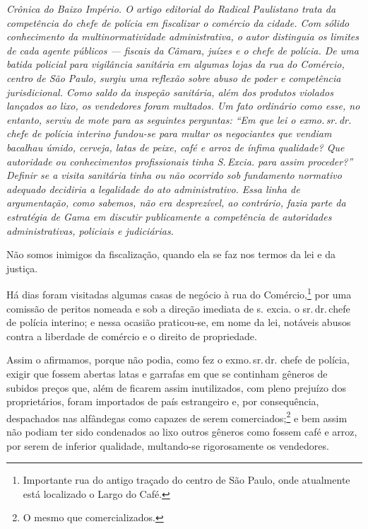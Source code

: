 \begin{didascalia}\itshape
Crônica do Baixo Império. O artigo editorial do \textnormal{Radical Paulistano}
trata da competência do chefe de polícia em fiscalizar o comércio
da cidade. Com sólido conhecimento da multinormatividade administrativa,
o autor distinguia os limites de cada agente públicos --- fiscais da
Câmara, juízes e o chefe de polícia. De uma batida policial para
vigilância sanitária em algumas lojas da rua do Comércio, centro de São
Paulo, surgiu uma reflexão sobre abuso de poder e competência
jurisdicional. Como saldo da inspeção sanitária, além dos produtos
violados lançados ao lixo, os vendedores foram multados. Um fato
ordinário como esse, no entanto, serviu de mote para as seguintes
perguntas: ``Em que lei o exmo.\,sr.\,dr.\,chefe de polícia interino
fundou-se para multar os negociantes que vendiam bacalhau úmido,
cerveja, latas de peixe, café e arroz de ínfima qualidade? Que
autoridade ou conhecimentos profissionais tinha S.\,Excia. para assim
proceder?'' Definir se a visita sanitária tinha ou não ocorrido sob
fundamento normativo adequado decidiria a legalidade do ato
administrativo. Essa linha de argumentação, como sabemos, não era
desprezível, ao contrário, fazia parte da estratégia de Gama em discutir
publicamente a competência de autoridades administrativas, policiais e
judiciárias.
\end{didascalia}



Não somos inimigos da fiscalização, quando ela se faz nos termos da lei
e da justiça.

Há dias foram visitadas algumas casas de negócio à rua do
Comércio,\footnote{Importante rua do antigo traçado do centro de São
  Paulo, onde atualmente está localizado o Largo do Café.} por uma
comissão de peritos nomeada e sob a direção imediata de s. excia. o sr.\,dr.\,chefe de polícia interino; e nessa ocasião praticou-se, em nome da
lei, notáveis abusos contra a liberdade de comércio e o direito de
propriedade.

Assim o afirmamos, porque não podia, como fez o exmo.\,sr.\,dr. chefe de
polícia, exigir que fossem abertas latas e garrafas em que se continham
gêneros de subidos preços que, além de ficarem assim inutilizados, com
pleno prejuízo dos proprietários, foram importados de país estrangeiro
e, por consequência, despachados nas alfândegas como capazes de serem
comerciados;\footnote{O mesmo que comercializados.} e bem assim não
podiam ter sido condenados ao lixo outros gêneros como fossem café e
arroz, por serem de inferior qualidade, multando-se rigorosamente os
vendedores.

